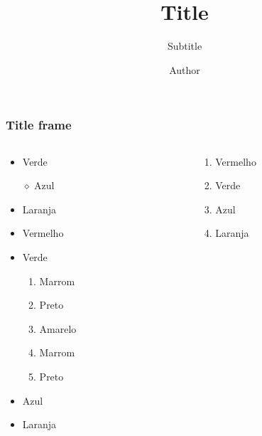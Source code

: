 \documentclass[10pt]{beamer}
\title{Title}
\subtitle{Subtitle}
\author{Author}
\begin{document}


\begin{frame}
    \frametitle{Title frame}

    \begin{columns}
        \begin{column}{4cm}
            \begin{itemize}
                \Item Vermelho \theordem
                \item Verde \theordem
                \item [$\diamond$]Azul \theordem
                \item Laranja \theordem
                \item Vermelho \theordem
                \item Verde \theordem
                \begin{enumerate}
                    \item Marrom \theordem
                    \item Preto \theordem
                    \item Amarelo \theordem
                    \item Marrom \theordem
                    \item Preto \theordem
                \end{enumerate}
                \item <2>Azul \theordem
                \item <2>[$\diamond$]Laranja \theordem
            \end{itemize}
        \end{column}
        \setcounter{ordem}{0}
        \begin{column}{4cm}
            \begin{enumerate}
                \item Vermelho \theordem
                \item <2>Verde \theordem
                \item Azul \theordem
                \item Laranja \theordem

\end{enumerate}
\end{column}
\end{columns}
\end{frame}
\end{document}
